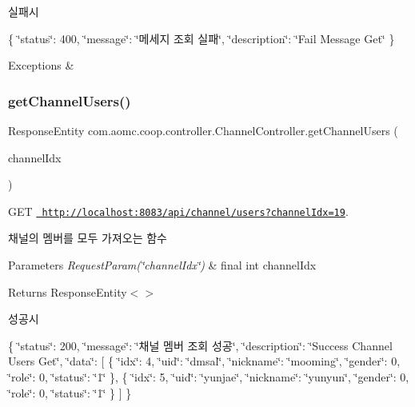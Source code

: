 실패시

\{ \char`\"{}status\char`\"{}\+: 400, \char`\"{}message\char`\"{}\+: \char`\"{}메세지 조회 실패\char`\"{}, \char`\"{}description\char`\"{}\+: \char`\"{}\+Fail Message Get\char`\"{} \}


\begin{DoxyExceptions}{Exceptions}
{\em } & \\
\hline
\end{DoxyExceptions}
\mbox{\label{classcom_1_1aomc_1_1coop_1_1controller_1_1_channel_controller_afd9fae1d2ded0204fa895480dc8ce9b2}} 
\subsubsection{\texorpdfstring{getChannelUsers()}{getChannelUsers()}}
{\footnotesize\ttfamily Response\+Entity com.\+aomc.\+coop.\+controller.\+Channel\+Controller.\+get\+Channel\+Users (\begin{DoxyParamCaption}\item[{@Request\+Param(\char`\"{}channel\+Idx\char`\"{}) final int}]{channel\+Idx }\end{DoxyParamCaption})}



G\+ET \href{http://localhost:8083/api/channel/users?channelIdx=19}{\texttt{ http\+://localhost\+:8083/api/channel/users?channel\+Idx=19}}. 

채널의 멤버를 모두 가져오는 함수


\begin{DoxyParams}{Parameters}
{\em Request\+Param(\char`\"{}channel\+Idx\char`\"{})} & final int channel\+Idx\\
\hline
\end{DoxyParams}
\begin{DoxyReturn}{Returns}
Response\+Entity$<$$>$
\end{DoxyReturn}
성공시

\{ \char`\"{}status\char`\"{}\+: 200, \char`\"{}message\char`\"{}\+: \char`\"{}채널 멤버 조회 성공\char`\"{}, \char`\"{}description\char`\"{}\+: \char`\"{}\+Success Channel Users Get\char`\"{}, \char`\"{}data\char`\"{}\+: \mbox{[} \{ \char`\"{}idx\char`\"{}\+: 4, \char`\"{}uid\char`\"{}\+: \char`\"{}dmsal\char`\"{}, \char`\"{}nickname\char`\"{}\+: \char`\"{}mooming\char`\"{}, \char`\"{}gender\char`\"{}\+: 0, \char`\"{}role\char`\"{}\+: 0, \char`\"{}status\char`\"{}\+: \char`\"{}1\char`\"{} \}, \{ \char`\"{}idx\char`\"{}\+: 5, \char`\"{}uid\char`\"{}\+: \char`\"{}yunjae\char`\"{}, \char`\"{}nickname\char`\"{}\+: \char`\"{}yunyun\char`\"{}, \char`\"{}gender\char`\"{}\+: 0, \char`\"{}role\char`\"{}\+: 0, \char`\"{}status\char`\"{}\+: \char`\"{}1\char`\"{} \} \mbox{]} \}

